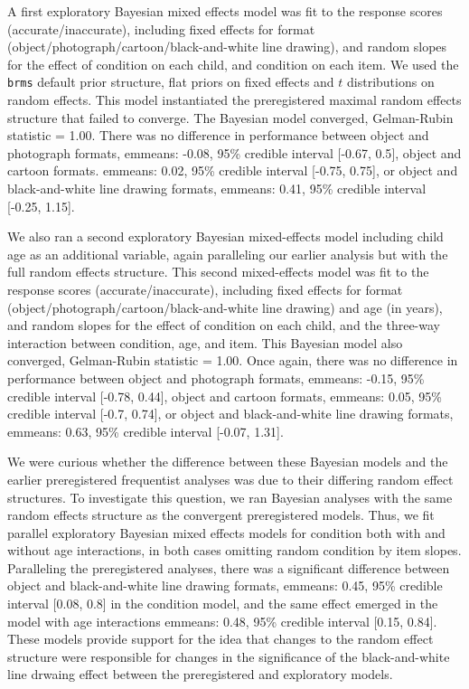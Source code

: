 \documentclass[10pt, letterpaper]{article}
\begin{document}
A first exploratory Bayesian mixed effects model was fit to the response
scores (accurate/inaccurate), including fixed effects for format
(object/photograph/cartoon/black-and-white line drawing), and random
slopes for the effect of condition on each child, and condition on each
item. We used the \texttt{brms} default prior structure, flat priors on
fixed effects and \(t\) distributions on random effects. This model
instantiated the preregistered maximal random effects structure that
failed to converge. The Bayesian model converged, Gelman-Rubin statistic
= 1.00. There was no difference in performance between object and
photograph formats, emmeans: -0.08, 95\% credible interval {[}-0.67,
0.5{]}, object and cartoon formats. emmeans: 0.02, 95\% credible
interval {[}-0.75, 0.75{]}, or object and black-and-white line drawing
formats, emmeans: 0.41, 95\% credible interval {[}-0.25, 1.15{]}.

We also ran a second exploratory Bayesian mixed-effects model including
child age as an additional variable, again paralleling our earlier
analysis but with the full random effects structure. This second
mixed-effects model was fit to the response scores
(accurate/inaccurate), including fixed effects for format
(object/photograph/cartoon/black-and-white line drawing) and age (in
years), and random slopes for the effect of condition on each child, and
the three-way interaction between condition, age, and item. This
Bayesian model also converged, Gelman-Rubin statistic = 1.00. Once
again, there was no difference in performance between object and
photograph formats, emmeans: -0.15, 95\% credible interval {[}-0.78,
0.44{]}, object and cartoon formats, emmeans: 0.05, 95\% credible
interval {[}-0.7, 0.74{]}, or object and black-and-white line drawing
formats, emmeans: 0.63, 95\% credible interval {[}-0.07, 1.31{]}.

We were curious whether the difference between these Bayesian models and
the earlier preregistered frequentist analyses was due to their
differing random effect structures. To investigate this question, we ran
Bayesian analyses with the same random effects structure as the
convergent preregistered models. Thus, we fit parallel exploratory
Bayesian mixed effects models for condition both with and without age
interactions, in both cases omitting random condition by item slopes.
Paralleling the preregistered analyses, there was a significant
difference between object and black-and-white line drawing formats,
emmeans: 0.45, 95\% credible interval {[}0.08, 0.8{]} in the condition
model, and the same effect emerged in the model with age interactions
emmeans: 0.48, 95\% credible interval {[}0.15, 0.84{]}. These models
provide support for the idea that changes to the random effect structure
were responsible for changes in the significance of the black-and-white
line drwaing effect between the preregistered and exploratory models.
\end{document}

